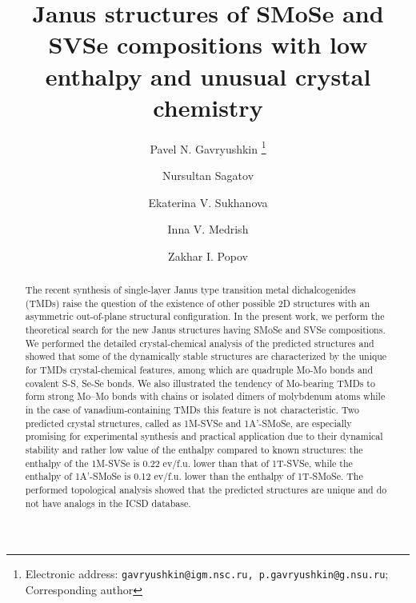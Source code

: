 \documentclass[a4paperm]{article}
\begin{document}

\title{Janus structures of SMoSe and SVSe compositions with low enthalpy and unusual crystal chemistry}



\author[1,2,3]{Pavel N. Gavryushkin
   \thanks{Electronic address: \texttt{gavryushkin@igm.nsc.ru, p.gavryushkin@g.nsu.ru}; Corresponding author}}     
\author[2]{Nursultan Sagatov}
\author[1]{Ekaterina V. Sukhanova}
\author[4]{Inna V. Medrish}
\author[1]{Zakhar I. Popov}




\date{}
\maketitle


\begin{abstract}
The recent synthesis of single-layer Janus type transition metal dichalcogenides (TMDs) raise the question of the existence of other possible 2D structures with an asymmetric out-of-plane structural configuration.
In the present work, we perform the theoretical search for the new Janus structures having SMoSe and SVSe compositions. We performed the detailed crystal-chemical analysis of the predicted structures and showed that some of the dynamically stable structures are characterized by the unique for TMDs crystal-chemical features, among which are quadruple Mo-Mo bonds and covalent S-S, Se-Se bonds. We also illustrated the tendency of Mo-bearing TMDs to form strong Mo--Mo bonds with chains or isolated dimers of molybdenum atoms while in the case of vanadium-containing TMDs this feature is not characteristic. Two predicted crystal structures, called as 1M-SVSe and 1A'-SMoSe, are especially promising for experimental synthesis and practical application due to their dynamical stability and rather low value of the enthalpy compared to known structures: the enthalpy of the 1M-SVSe is 0.22 ev/f.u. lower than that of 1T-SVSe, while the enthalpy of 1A'-SMoSe is 0.12 ev/f.u. lower than the enthalpy of 1T-SMoSe. The performed topological analysis showed that the predicted structures are unique and do not have analogs in the ICSD database.
\end{abstract}
\end{document}
